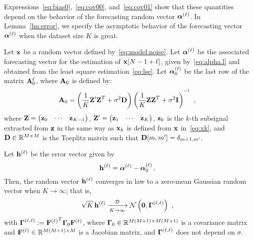 Expressions~\eqref{eq:bias0},~\eqref{eq:cov00}, and~\eqref{eq:cov01} show that these quantities depend on the behavior of the forecasting random vector $\boldsymbol{\alpha}^{(\ell)}$. In Lemma~\ref{lm:error}, we specify the asymptotic behavior of the forecasting vector $\boldsymbol{\alpha}^{(\ell)}$ when the dataset size $K$ is great.
\begin{lemma}
\label{lm:error}
Let ${\mathbf x}$ be a random vector defined by~\eqref{eq:model.noise}. Let $\boldsymbol{\alpha}^{(\ell)}$ be the associated forecasting vector for the estimation of ${\mathbf x}[N-1+\ell]$, given by~\eqref{eq:alpha.l} and obtained from the least square estimation~\eqref{eq:lse}. Let $\boldsymbol{\alpha}_0^{(\ell)}$ be the last row of the matrix ${\mathbf A}_0^\ell$, where ${\mathbf A}_0$ is defined by:
\begin{equation}
\bA_0 = \left(\dfrac1K\bZ'\bZ^T+\sigma^2\bD\right)\left(\dfrac1K\bZ\bZ^T+\sigma^2\bI\right)^{\inv}\ ,
\label{eq:lse.0}
\end{equation}
where ${\mathbf Z}=\begin{pmatrix} {\mathbf z}_0 & \cdots & {\mathbf z}_{K-1}\end{pmatrix}$, ${\mathbf Z}'=\begin{pmatrix} {\mathbf z}_1 & \cdots & {\mathbf z}_{K}\end{pmatrix}$, ${\mathbf z}_k$ is the $k$-th subsignal extracted from ${\mathbf z}$ in the same way as ${\mathbf x}_k$ is defined from ${\mathbf x}$ in~\eqref{eq:xk}, and ${\mathbf D}\in{\mathbb R}^{M\times M}$ is the Toeplitz matrix such that ${\mathbf D}[m,m'] = \delta_{m+1,m'}$.

Let ${\mathbf h}^{(\ell)}$ be the error vector given by
\begin{equation*}
{\mathbf h}^{(\ell)} = \boldsymbol{\alpha}^{(\ell)} - \boldsymbol{\alpha}_0^{(\ell)}\, .
\end{equation*}
Then, the random vector ${\mathbf h}^{(\ell)}$ converges in law to a zero-mean Gaussian random vector when $K\to\infty$; that is,
\begin{equation}
\sqrt{K}\,{\mathbf h}^{(\ell)}  \xrightarrow[K\to\infty]{{\mathcal D}} {\mathcal N}\left(\boldsymbol{0},\boldsymbol{\Gamma}^{(\ell,\ell)}\right)\ ,
\end{equation}
with $\boldsymbol{\Gamma}^{(\ell,\ell)}:={{\mathbf F}^{(\ell)}}^T\boldsymbol{\Gamma}_0{\mathbf F}^{(\ell)}$, where $\boldsymbol{\Gamma}_0\in{\mathbb R}^{M(M+1)\times M(M+1)}$ is a covariance matrix and ${\mathbf F}^{(\ell)}\in{\mathbb R}^{M(M+1)\times M}$ is a Jacobian matrix, and $\boldsymbol{\Gamma}^{(\ell,\ell)}$ does not depend on $\sigma$. 
\end{lemma}

